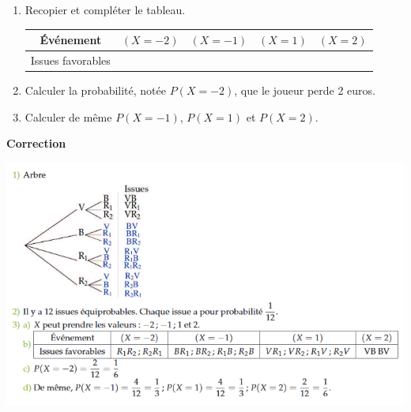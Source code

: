 \documentclass[11pt]{cornouaille}
\begin{document}
\begin{enumerate}
\begin{enumerate}
    \item Recopier et compl\'{e}ter le tableau.

      \begin{center}
        \begin{tabular}{|c|c|c|c|c|}
          \hline 
          {\cellcolor{FondTableaux}\'{E}v\'{e}nement} & $\left( {X = - 2}
          \right)$ & $\left( {X = - 1} \right)$ & $\left( {X = 1}
          \right)$ & $\left( {X = 2} \right)$ \\\hline 
          {\cellcolor{FondTableaux} Issues favorables} & & & & \\\hline
        \end{tabular}
      \end{center}

    \item  Calculer la probabilit\'{e}, not\'{e}e $P\left( {X
          = - 2} \right)$, que le joueur perde 2 euros.

    \item Calculer de m\^{e}me $P\left( {X = - 1} \right)$, $P\left(
        {X = 1} \right)$ et $P\left( {X = 2} \right)$.
    \end{enumerate}
  \end{enumerate}

\textbf{Correction}

\begin{center}
	\includegraphics[scale=0.8]{corr1.png}
\end{center}

\bigskip
\end{document}
